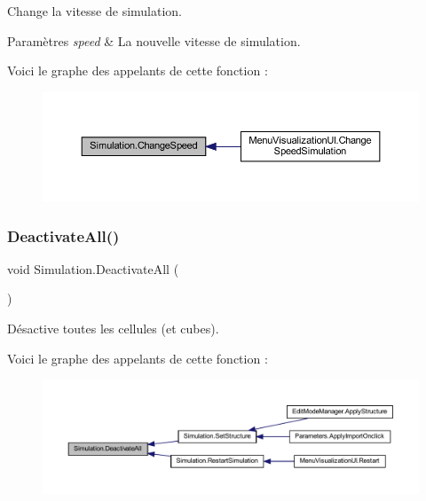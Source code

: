 Change la vitesse de simulation. 


\begin{DoxyParams}{Paramètres}
{\em speed} & La nouvelle vitesse de simulation.\\
\hline
\end{DoxyParams}
Voici le graphe des appelants de cette fonction \+:
\nopagebreak
\begin{figure}[H]
\begin{center}
\leavevmode
\includegraphics[width=350pt]{class_simulation_a3fde1a020def21f5f41794735b76c686_icgraph}
\end{center}
\end{figure}
\mbox{\label{class_simulation_abc1bd1d93c293257a921a8a8935095b6}} 
\subsubsection{\texorpdfstring{Deactivate\+All()}{DeactivateAll()}}
{\footnotesize\ttfamily void Simulation.\+Deactivate\+All (\begin{DoxyParamCaption}{ }\end{DoxyParamCaption})\hspace{0.3cm}{\ttfamily [inline]}}



Désactive toutes les cellules (et cubes). 

Voici le graphe des appelants de cette fonction \+:
\nopagebreak
\begin{figure}[H]
\begin{center}
\leavevmode
\includegraphics[width=350pt]{class_simulation_abc1bd1d93c293257a921a8a8935095b6_icgraph}
\end{center}
\end{figure}
\mbox{\label{class_simulation_a71a9e0a93e05353ff243f4c48afa67d0}} 
